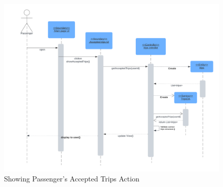 \documentclass[a4paper, 12pt]{report} %
\begin{document}
        \begin{figure}
            \centering
            \includegraphics[width=0.9\linewidth]{Images/Passenger Accepted.png}
            \caption{Showing Passenger's Accepted Trips Action}
            \label{fig:seq_dig_pass_accepted}
        \end{figure}

        \FloatBarrier



\end{document}
